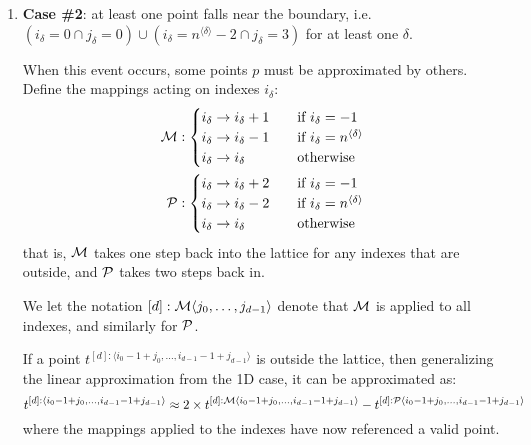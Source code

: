 \documentclass[11pt]{article}
\begin{document}
\begin{enumerate}
\item \textbf{Case \#2}: at least one point falls near the boundary, i.e. $( i_\delta = 0 \cap j_\delta = 0 ) \cup ( i_\delta = n^{\langle \delta \rangle}-2 \cap j_\delta = 3)$ for at least one $\delta$.

When this event occurs, some points $p$ must be approximated by others. Define the mappings acting on indexes $i_\delta$:
\begin{equation}
\begin{split}
{\cal M} : \begin{cases}
	i_\delta \rightarrow i_\delta + 1 \quad &\text{if } i_\delta=-1 \\
	i_\delta \rightarrow i_\delta - 1 \quad &\text{if } i_\delta = n^{\langle \delta \rangle} \\
	i_\delta \rightarrow i_\delta \quad &\text{otherwise}
\end{cases} \\
{\cal P} : \begin{cases}
	i_\delta \rightarrow i_\delta + 2 \quad &\text{if } i_\delta=-1 \\
	i_\delta \rightarrow i_\delta - 2 \quad &\text{if } i_\delta = n^{\langle \delta \rangle} \\
	i_\delta \rightarrow i_\delta \quad &\text{otherwise}
\end{cases}
\end{split}
\end{equation}
that is, ${\cal M}$ takes one step back into the lattice for any indexes that are outside, and ${\cal P}$ takes two steps back in.

We let the notation $[d]: {\cal M} \langle j_0, \dots, j_{d-1} \rangle$ denote that ${\cal M}$ is applied to all indexes, and similarly for ${\cal P}$.

If a point $t^{[d]:\langle i_0-1+j_0, \dots, i_{d-1}-1+j_{d-1} \rangle}$ is outside the lattice, then generalizing the linear approximation from the 1D case, it can be approximated as:
\begin{equation*}
t^{[d]:\langle i_0-1+j_0, \dots, i_{d-1}-1+j_{d-1} \rangle} \approx 2 \times t^{[d]:{\cal M}\langle i_0-1+j_0, \dots, i_{d-1}-1+j_{d-1} \rangle} - t^{[d]:{\cal P}\langle i_0-1+j_0, \dots, i_{d-1}-1+j_{d-1} \rangle}
\end{equation*}
where the mappings applied to the indexes have now referenced a valid point.

\end{enumerate}
\end{document}
